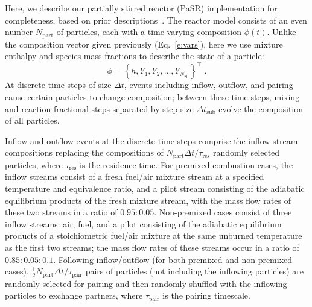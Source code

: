 \documentclass[preprint,12pt]{elsarticle}
\newcommand{ \numsp }{N_{\text{sp}}}
\begin{document}
{Here, we describe our partially stirred reactor (PaSR) implementation for completeness, based on prior descriptions~\cite{Correa:1993ud,Chen:1997ta,Pope:1997wu,Bhave:2004hc,Ren:2004fz,Ren:2014cd}.
The reactor model consists of an even number $N_{\text{part}}$ of particles, each with a time-varying composition $\phi (t)$.
Unlike the composition vector given previously (Eq.~\eqref{e:vars}), here we use mixture enthalpy and species mass fractions to describe the state of a particle:
\begin{equation}
\phi = \left \lbrace h, Y_1, Y_2, \dotsc, Y_{\numsp} \right \rbrace^{\intercal} \;.
\end{equation}
At discrete time steps of size $\Delta t$, events including inflow, outflow, and pairing cause certain particles to change composition; between these time steps, mixing and reaction fractional steps separated by step size $\Delta t_{\text{sub}}$ evolve the composition of all particles.

Inflow and outflow events at the discrete time steps comprise the inflow stream compositions replacing the compositions of $N_{\text{part}} \Delta t / \tau_{\text{res}}$ randomly selected particles, where $\tau_{\text{res}}$ is the residence time.
For premixed combustion cases, the inflow streams consist of a fresh fuel\slash air mixture stream at a specified temperature and equivalence ratio, and a pilot stream consisting of the adiabatic equilibrium products of the fresh mixture stream, with the mass flow rates of these two streams in a ratio of $0.95 \mathbin{:} 0.05$.
Non-premixed cases consist of three inflow streams: air, fuel, and a pilot consisting of the adiabatic equilibrium products of a stoichiometric fuel\slash air mixture at the same unburned temperature as the first two streams; the mass flow rates of these streams occur in a ratio of $0.85 \mathbin{:} 0.05 \mathbin{:} 0.1$.
Following inflow\slash outflow (for both premixed and non-premixed cases), $\frac{1}{2} N_{\text{part}} \Delta t / \tau_{\text{pair}}$ pairs of particles (not including the inflowing particles) are randomly selected for pairing and then randomly shuffled with the inflowing particles to exchange partners, where $\tau_{\text{pair}}$ is the pairing timescale.

}
\end{document}
